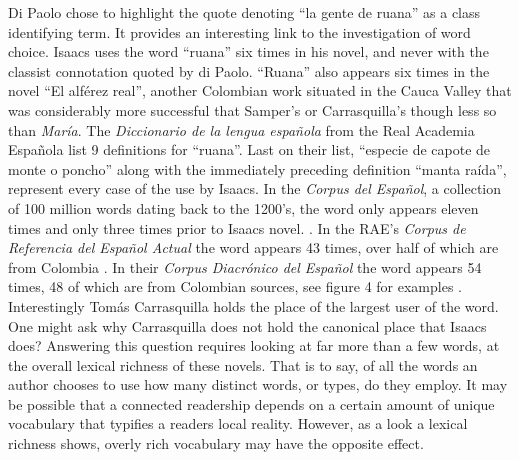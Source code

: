 \documentclass[12pt]{report}\usepackage[]{graphicx}\usepackage[]{color}
\begin{document}
\begin{spacing}{1.9}
Di Paolo chose to highlight the quote denoting \enquote{la gente de ruana} as a class identifying term. It provides an interesting link to the investigation of word choice.
Isaacs uses the word \enquote{ruana} six times in his novel, and never with the classist connotation quoted by di Paolo.
\enquote{Ruana} also appears six times in the novel \enquote{El alférez real}, another Colombian work situated in the Cauca Valley that was considerably more successful that Samper's or Carrasquilla's though less so than \textit{María}.
The \textit{Diccionario de la lengua española} from the Real Academia Española list 9 definitions for \enquote{ruana}.
Last on their list, \enquote{especie de capote de monte o poncho} along with the immediately preceding definition \enquote{manta raída}, represent every case of the use by Isaacs.
In the \textit{Corpus del Español}, a collection of 100 million words dating back to the 1200's, the word only appears eleven times and only three times prior to Isaacs novel. \autocite{Davies2012}. 
In the RAE's \textit{Corpus de Referencia del Español Actual} the word appears 43 times, over half of which are from Colombia \autocite{Crea}.
In their \textit{Corpus Diacrónico del Español} the word appears 54 times, 48 of which are from Colombian sources, see figure 4 for examples \autocite{Corde}.
Interestingly Tomás Carrasquilla holds the place of the largest user of the word.
One might ask why Carrasquilla does not hold the canonical place that Isaacs does?
Answering this question requires looking at far more than a few words, at the overall lexical richness of these novels.
That is to say, of all the words an author chooses to use how many distinct words, or types, do they employ.
It may be possible that a connected readership depends on a certain amount of unique vocabulary that typifies a readers local reality.
However, as a look a lexical richness shows, overly rich vocabulary may have the opposite effect. 


\end{spacing}
\end{document}
